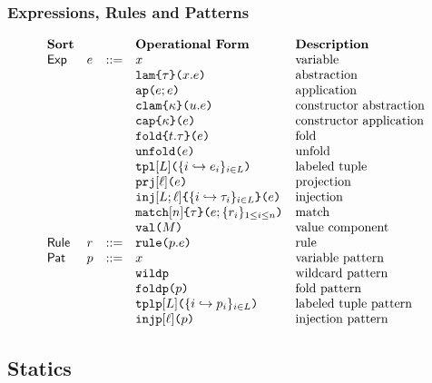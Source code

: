 \subsubsection{Expressions, Rules and Patterns}
\[\begin{array}{lllllll}
\textbf{Sort} & & & \textbf{Operational Form} 
& \textbf{Description}\\
\mathsf{Exp} & e & ::= & x 
& \text{variable}\\
&&& \aelam{\tau}{x}{e} 
& \text{abstraction}\\
&&& \aeap{e}{e} 
& \text{application}\\
&&& \aeclam{\kappa}{u}{e} %
& \text{constructor abstraction}\\
&&& \aecap{e}{\kappa} %
& \text{constructor application}\\
&&& \aefold{t}{\tau}{e} %
& \text{fold}\\
&&& \aeunfold{e} %
& \text{unfold}\\
&&& \aetpl{\labelset}{\mapschema{e}{i}{\labelset}} 
& \text{labeled tuple}\\
&&& \aepr{\ell}{e} 
& \text{projection}\\
&&& \aein{\labelset}{\ell}{\mapschema{\tau}{i}{\labelset}}{e} 
& \text{injection}\\
&&& \aematchwith{n}{\tau}{e}{\seqschemaX{r}} 
& \text{match}\\
&&& \amval{M} 
& \text{value component}\\
\mathsf{Rule} & r & ::= & \aematchrule{p}{e} 
& \text{rule}\\
\mathsf{Pat} & p & ::= & x 
& \text{variable pattern}\\
&&& \aewildp 
& \text{wildcard pattern}\\
&&& \aefoldp{p} 
& \text{fold pattern}\\
&&& \aetplp{\labelset}{\mapschema{p}{i}{\labelset}} 
& \text{labeled tuple pattern}\\
&&& \aeinjp{\ell}{p} 
& \text{injection pattern}
\end{array}\]

\subsection{Statics}\label{appendix:P-statics}
